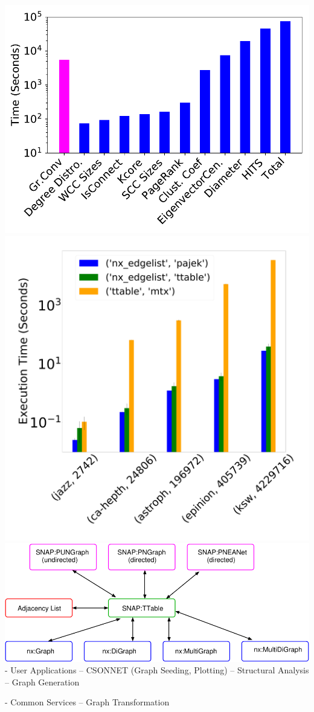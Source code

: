 \documentclass[landscape,a0paper,fontscale=0.285]{baposter} %
\begin{document}
\begin{poster}
{\includegraphics[scale=0.3]{figures/g4_timing.pdf}
\includegraphics[scale=0.3]{figures/scatter_bar_to_ttable.pdf}
\includegraphics[scale=0.3]{figures/star_trans.pdf}
- User Applications
-- CSONNET (Graph Seeding, Plotting)
-- Structural Analysis
-- Graph Generation

- Common Services
-- Graph Transformation

} 


\end{poster}
\end{document}
